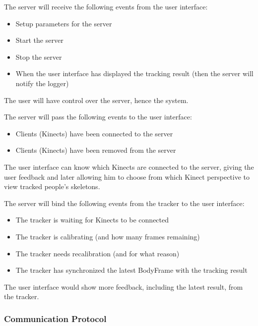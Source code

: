\documentclass{sigchi}
\begin{document}
The server will receive the following events from the user interface:

\begin{itemize}
  \item Setup parameters for the server
  \item Start the server
  \item Stop the server
  \item When the user interface has displayed the tracking result (then the server will notify the logger)
\end{itemize}

The user will have control over the server, hence the system.

The server will pass the following events to the user interface:

\begin{itemize}
  \item Clients (Kinects) have been connected to the server
  \item Clients (Kinects) have been removed from the server
\end{itemize}

The user interface can know which Kinects are connected to the server, giving the user feedback and later allowing him to choose from which Kinect perspective to view tracked people's skeletons.

The server will bind the following events from the tracker to the user interface:

\begin{itemize}
  \item The tracker is waiting for Kinects to be connected
  \item The tracker is calibrating (and how many frames remaining)
  \item The tracker needs recalibration (and for what reason)
  \item The tracker has synchronized the latest BodyFrame with the tracking result 
\end{itemize}

The user interface would show more feedback, including the latest result, from the tracker.

\subsubsection{Communication Protocol}
\end{document}
